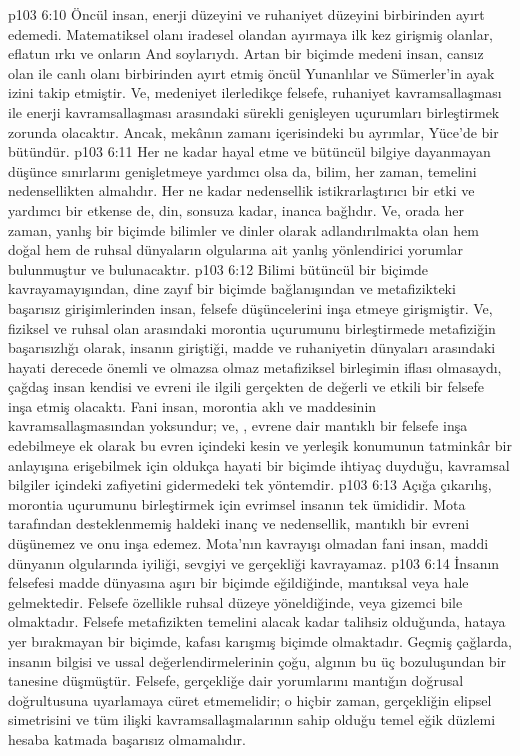 \vs p103 6:10 Öncül insan, enerji düzeyini ve ruhaniyet düzeyini birbirinden ayırt edemedi. Matematiksel olanı iradesel olandan ayırmaya ilk kez girişmiş olanlar, eflatun ırkı ve onların And soylarıydı. Artan bir biçimde medeni insan, cansız olan ile canlı olanı birbirinden ayırt etmiş öncül Yunanlılar ve Sümerler’in ayak izini takip etmiştir. Ve, medeniyet ilerledikçe felsefe, ruhaniyet kavramsallaşması ile enerji kavramsallaşması arasındaki sürekli genişleyen uçurumları birleştirmek zorunda olacaktır. Ancak, mekânın zamanı içerisindeki bu ayrımlar, Yüce’de bir bütündür.
\vs p103 6:11 Her ne kadar hayal etme ve bütüncül bilgiye dayanmayan düşünce sınırlarını genişletmeye yardımcı olsa da, bilim, her zaman, temelini nedensellikten almalıdır. Her ne kadar nedensellik istikrarlaştırıcı bir etki ve yardımcı bir etkense de, din, sonsuza kadar, inanca bağlıdır. Ve, orada her zaman, yanlış bir biçimde bilimler ve dinler olarak adlandırılmakta olan hem doğal hem de ruhsal dünyaların olgularına ait yanlış yönlendirici yorumlar bulunmuştur ve bulunacaktır.
\vs p103 6:12 Bilimi bütüncül bir biçimde kavrayamayışından, dine zayıf bir biçimde bağlanışından ve metafizikteki başarısız girişimlerinden insan, felsefe düşüncelerini inşa etmeye girişmiştir. Ve, fiziksel ve ruhsal olan arasındaki morontia uçurumunu birleştirmede metafiziğin başarısızlığı olarak, insanın giriştiği, madde ve ruhaniyetin dünyaları arasındaki hayati derecede önemli ve olmazsa olmaz metafiziksel birleşimin iflası olmasaydı, çağdaş insan kendisi ve evreni ile ilgili gerçekten de değerli ve etkili bir felsefe inşa etmiş olacaktı. Fani insan, morontia aklı ve maddesinin kavramsallaşmasından yoksundur; ve, , evrene dair mantıklı bir felsefe inşa edebilmeye ek olarak bu evren içindeki kesin ve yerleşik konumunun tatminkâr bir anlayışına erişebilmek için oldukça hayati bir biçimde ihtiyaç duyduğu, kavramsal bilgiler içindeki zafiyetini gidermedeki tek yöntemdir.
\vs p103 6:13 Açığa çıkarılış, morontia uçurumunu birleştirmek için evrimsel insanın tek ümididir. Mota tarafından desteklenmemiş haldeki inanç ve nedensellik, mantıklı bir evreni düşünemez ve onu inşa edemez. Mota’nın kavrayışı olmadan fani insan, maddi dünyanın olgularında iyiliği, sevgiyi ve gerçekliği kavrayamaz.
\vs p103 6:14 İnsanın felsefesi madde dünyasına aşırı bir biçimde eğildiğinde, mantıksal veya  hale gelmektedir. Felsefe özellikle ruhsal düzeye yöneldiğinde,  veya gizemci bile olmaktadır. Felsefe metafizikten temelini alacak kadar talihsiz olduğunda, hataya yer bırakmayan bir biçimde, kafası karışmış biçimde  olmaktadır. Geçmiş çağlarda, insanın bilgisi ve ussal değerlendirmelerinin çoğu, algının bu üç bozuluşundan bir tanesine düşmüştür. Felsefe, gerçekliğe dair yorumlarını mantığın doğrusal doğrultusuna uyarlamaya cüret etmemelidir; o hiçbir zaman, gerçekliğin elipsel simetrisini ve tüm ilişki kavramsallaşmalarının sahip olduğu temel eğik düzlemi hesaba katmada başarısız olmamalıdır.
